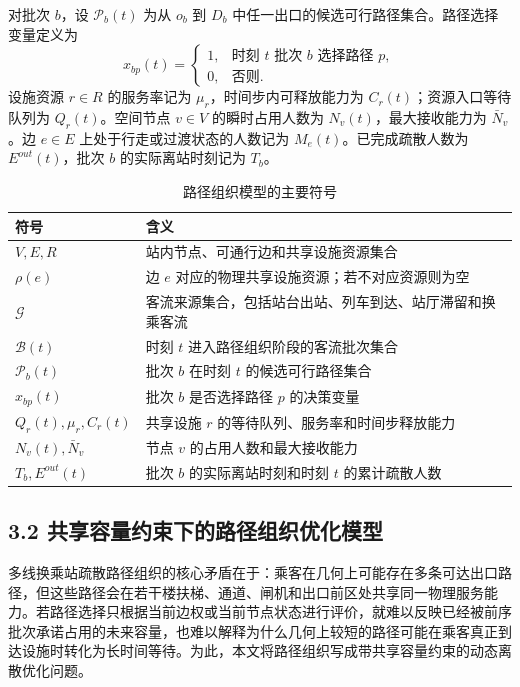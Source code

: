 \documentclass[UTF8,a4paper,12pt]{ctexart}
\begin{document}
对批次 \(b\)，设 \(\mathcal P_b(t)\) 为从 \(o_b\) 到 \(D_b\) 中任一出口的候选可行路径集合。路径选择变量定义为
\[
x_{bp}(t)=
\begin{cases}
1, & \text{时刻 }t\text{ 批次 }b\text{ 选择路径 }p,\\
0, & \text{否则}.
\end{cases}
\]
设施资源 \(r\in R\) 的服务率记为 \(\mu_r\)，时间步内可释放能力为 \(C_r(t)\)；资源入口等待队列为 \(Q_r(t)\)。空间节点 \(v\in V\) 的瞬时占用人数为 \(N_v(t)\)，最大接收能力为 \(\bar N_v\)。边 \(e\in E\) 上处于行走或过渡状态的人数记为 \(M_e(t)\)。已完成疏散人数为 \(E^{out}(t)\)，批次 \(b\) 的实际离站时刻记为 \(T_b\)。

\begin{table}[htbp]
\centering
\caption{路径组织模型的主要符号}
\small
\begin{tabular}{p{}p{}}
\toprule
符号 & 含义 \\
\midrule
\(V,E,R\) & 站内节点、可通行边和共享设施资源集合 \\
\(\rho(e)\) & 边 \(e\) 对应的物理共享设施资源；若不对应资源则为空 \\
\(\mathcal G\) & 客流来源集合，包括站台出站、列车到达、站厅滞留和换乘客流 \\
\(\mathcal B(t)\) & 时刻 \(t\) 进入路径组织阶段的客流批次集合 \\
\(\mathcal P_b(t)\) & 批次 \(b\) 在时刻 \(t\) 的候选可行路径集合 \\
\(x_{bp}(t)\) & 批次 \(b\) 是否选择路径 \(p\) 的决策变量 \\
\(Q_r(t),\mu_r,C_r(t)\) & 共享设施 \(r\) 的等待队列、服务率和时间步释放能力 \\
\(N_v(t),\bar N_v\) & 节点 \(v\) 的占用人数和最大接收能力 \\
\(T_b,E^{out}(t)\) & 批次 \(b\) 的实际离站时刻和时刻 \(t\) 的累计疏散人数 \\
\bottomrule
\end{tabular}
\end{table}

\subsection{3.2 共享容量约束下的路径组织优化模型}

多线换乘站疏散路径组织的核心矛盾在于：乘客在几何上可能存在多条可达出口路径，但这些路径会在若干楼扶梯、通道、闸机和出口前区处共享同一物理服务能力。若路径选择只根据当前边权或当前节点状态进行评价，就难以反映已经被前序批次承诺占用的未来容量，也难以解释为什么几何上较短的路径可能在乘客真正到达设施时转化为长时间等待。为此，本文将路径组织写成带共享容量约束的动态离散优化问题。
\end{document}
